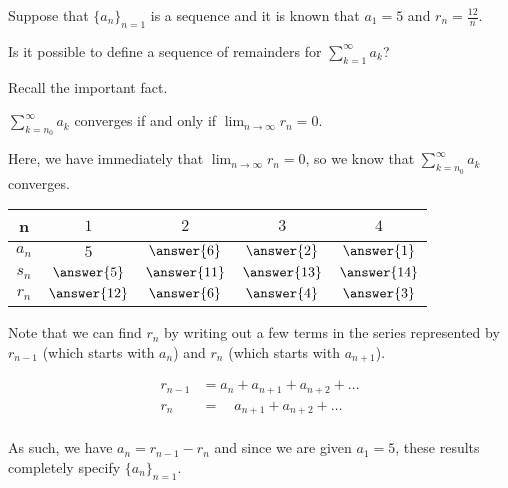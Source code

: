 \documentclass{ximera}
\author{Jim Talamo}
\begin{document}
\begin{exercise}

Suppose that $\{a_n\}_{n=1}$ is a sequence and it is known that $a_1 =5$ and $r_n = \frac{12}{n}$.

Is it possible to define a sequence of remainders for $\sum_{k=1}^{\infty} a_k$?

\begin{multipleChoice}
\end{multipleChoice}

\begin{feedback}
Recall the important fact.

\begin{fact}
$\sum_{k=n_0}^\infty a_k$ converges if and only if $\lim_{n \to \infty} r_n = 0$.  
\end{fact}
Here, we have immediately that $\lim_{n \to \infty} r_n = 0$, so we know that $\sum_{k=n_0}^\infty a_k$ converges.

\end{feedback}

\begin{exercise}
\begin{center}
\begin{tabular}{c | c | c | c | c }
n& $1$ & $2$ & $3$ & $4$ \\ [2 ex]
\hline
$a_n$ & $ 5$ &$ \answer{6}$ & $ \answer{2}$ & $ \answer{1}$  \\ [2 ex]
\hline
$s_n$ & $ \answer{5}$ &$ \answer{11}$ & $ \answer{13}$ & $ \answer{14}$  \\ [2 ex]
\hline
$r_n$ & $ \answer{12}$ & $ \answer{6}$ & $ \answer{4}$ & $ \answer{3}$ 
\end{tabular}
\end{center}

\begin{hint}
Note that we can find $r_n$ by writing out a few terms in the series represented by $r_{n-1}$ (which starts with $a_n$) and $r_n$ (which starts with $a_{n+1}$).

\begin{align*}
r_{n-1} &= a_n+a_{n+1}+a_{n+2}+\ldots \\
r_{n} &= \phantom{a_n}  a_{n+1}+a_{n+2}+\ldots \\
\end{align*}

As such, we have $a_n = r_{n-1}-r_n$ and since we are given $a_1=5$, these results completely specify $\{a_n\}_{n=1}$.
\end{hint}


\end{exercise}
\end{exercise}
\end{document}
